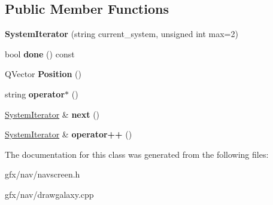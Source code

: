 \subsection*{Public Member Functions}
\begin{DoxyCompactItemize}
\item 
{\bfseries System\+Iterator} (string current\+\_\+system, unsigned int max=2)\hypertarget{classNavigationSystem_1_1SystemIterator_a49ab4110b3ad06916297e986b17b9c53}{}\label{classNavigationSystem_1_1SystemIterator_a49ab4110b3ad06916297e986b17b9c53}

\item 
bool {\bfseries done} () const \hypertarget{classNavigationSystem_1_1SystemIterator_a9b63fc16633f4fe1f74f0ce2283c6f7b}{}\label{classNavigationSystem_1_1SystemIterator_a9b63fc16633f4fe1f74f0ce2283c6f7b}

\item 
Q\+Vector {\bfseries Position} ()\hypertarget{classNavigationSystem_1_1SystemIterator_abbdaaa9489a55775a1fd94abef5404e7}{}\label{classNavigationSystem_1_1SystemIterator_abbdaaa9489a55775a1fd94abef5404e7}

\item 
string {\bfseries operator$\ast$} ()\hypertarget{classNavigationSystem_1_1SystemIterator_ac6471f8dd70ceb53d23770123145ae81}{}\label{classNavigationSystem_1_1SystemIterator_ac6471f8dd70ceb53d23770123145ae81}

\item 
\hyperlink{classNavigationSystem_1_1SystemIterator}{System\+Iterator} \& {\bfseries next} ()\hypertarget{classNavigationSystem_1_1SystemIterator_abab6a9cf393218773b06d0949da8453c}{}\label{classNavigationSystem_1_1SystemIterator_abab6a9cf393218773b06d0949da8453c}

\item 
\hyperlink{classNavigationSystem_1_1SystemIterator}{System\+Iterator} \& {\bfseries operator++} ()\hypertarget{classNavigationSystem_1_1SystemIterator_a5a81a56212b2a2d4034c7781ccc99e87}{}\label{classNavigationSystem_1_1SystemIterator_a5a81a56212b2a2d4034c7781ccc99e87}

\end{DoxyCompactItemize}


The documentation for this class was generated from the following files\+:\begin{DoxyCompactItemize}
\item 
gfx/nav/navscreen.\+h\item 
gfx/nav/drawgalaxy.\+cpp\end{DoxyCompactItemize}
